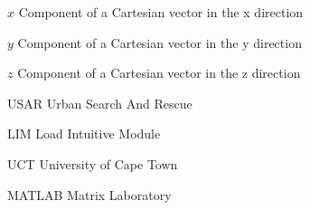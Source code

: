 \begin{Nomencl}[1cm]
    \item[$x$] Component of a Cartesian vector in the x direction
    \item[$y$] Component of a Cartesian vector in the y direction
    \item[$z$] Component of a Cartesian vector in the z direction

\end{Nomencl}

\begin{Nomencl}[1cm]
    \item[USAR] Urban Search And Rescue
    \item[LIM] Load Intuitive Module
    \item[UCT] University of Cape Town
    \item[MATLAB] Matrix Laboratory

\end{Nomencl}
